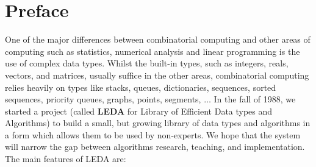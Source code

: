 \chapter{Preface} \label{Preface}

One of the major differences between combinatorial computing and other areas of
computing such as statistics, numerical analysis and linear programming is the
use of complex data types.  Whilst the built-in types, such as integers, reals,
vectors, and matrices, usually suffice in the other areas, combinatorial
computing relies heavily on types like stacks, queues, dictionaries, sequences,
sorted sequences, priority queues, graphs, points, segments, $\ldots$ In the
fall of 1988, we started a project (called {\bf LEDA} for Library of Efficient
Data types and Algorithms) to build a small, but growing library of data types
and algorithms in a form which allows them to be used by non-experts. We hope
that the system will narrow the gap between algorithms research, teaching, and
implementation. The main features of LEDA are:

